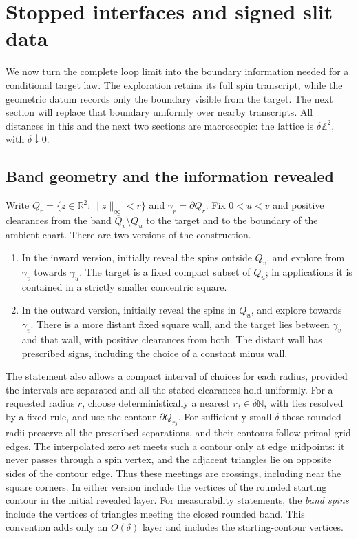 \section{Stopped interfaces and signed slit data}\label{if:section}

We now turn the complete loop limit into the boundary information needed
for a conditional target law. The exploration retains its full spin
transcript, while the geometric datum records only the boundary visible
from the target. The next section will replace that boundary uniformly
over nearby transcripts. All distances in this and the next two sections
are macroscopic: the lattice is $\delta\mathbb Z^2$, with
$\delta\downarrow0$.

\subsection{Band geometry and the information revealed}

Write $Q_r=\{z\in\mathbb R^2:\|z\|_\infty<r\}$ and
$\gamma_r=\partial Q_r$.  Fix $0<u<v$ and positive clearances from the
band $\overline Q_v\setminus Q_u$ to the target and to the boundary of
the ambient chart.  There are two versions of the construction.
\begin{enumerate}
\item In the inward version, initially reveal the spins outside $Q_v$,
      and explore from $\gamma_v$ towards $\gamma_u$.  The target is a
      fixed compact subset of $Q_u$; in applications it is contained in
      a strictly smaller concentric square.
\item In the outward version, initially reveal the spins in $Q_u$,
      and explore towards $\gamma_v$.  There is a more distant fixed
      square wall, and the target lies between $\gamma_v$ and that wall,
      with positive clearances from both.  The distant wall has prescribed
      signs, including the choice of a constant minus wall.
\end{enumerate}
The statement also allows a compact interval of choices for each radius,
provided the intervals are separated and all the stated clearances hold
uniformly. For a requested radius $r$, choose deterministically a nearest
$r_\delta\in\delta\mathbb N$, with ties resolved by a fixed rule, and
use the contour $\partial Q_{r_\delta}$. For sufficiently small $\delta$
these rounded radii preserve all the prescribed separations, and their
contours follow primal grid edges. The
interpolated zero set meets such a contour only at edge midpoints:
it never passes through a spin vertex, and the adjacent triangles
lie on opposite sides of the contour edge.  Thus these meetings are
crossings, including near the square corners.
In either version include the vertices of the rounded starting contour
in the initial revealed layer.
For measurability statements, the \emph{band spins} include the vertices
of triangles meeting the closed rounded band. This convention adds only
an $O(\delta)$ layer and includes the starting-contour vertices.

